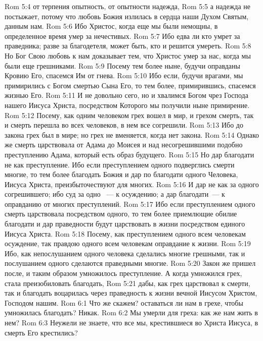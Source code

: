 \vs Rom 5:4 от терпения опытность, от опытности надежда,
\vs Rom 5:5 а надежда не постыжает, потому что любовь Божия излилась в сердца наши Духом Святым, данным нам.
\vs Rom 5:6 Ибо Христос, когда еще мы были немощны, в определенное время умер за нечестивых.
\vs Rom 5:7 Ибо едва ли кто умрет за праведника; разве за благодетеля, может быть, кто и решится умереть.
\vs Rom 5:8 Но Бог Свою любовь к нам доказывает тем, что Христос умер за нас, когда мы были еще грешниками.
\vs Rom 5:9 Посему тем более ныне, будучи оправданы Кровию Его, спасемся Им от гнева.
\vs Rom 5:10 Ибо если, будучи врагами, мы примирились с Богом смертью Сына Его, то тем более, примирившись, спасемся жизнью Его.
\vs Rom 5:11 И не довольно сего, но и хвалимся Богом чрез Господа нашего Иисуса Христа, посредством Которого мы получили ныне примирение.
\rsbpar\vs Rom 5:12 Посему, как одним человеком грех вошел в мир, и грехом смерть, так и смерть перешла во всех человеков,  в нем все согрешили.
\vs Rom 5:13 Ибо  до закона грех был в мире; но грех не вменяется, когда нет закона.
\vs Rom 5:14 Однако же смерть царствовала от Адама до Моисея и над несогрешившими подобно преступлению Адама, который есть образ будущего.
\vs Rom 5:15 Но дар благодати не как преступление. Ибо если преступлением одного подверглись смерти многие, то тем более благодать Божия и дар по благодати одного Человека, Иисуса Христа, преизбыточествуют для многих.
\vs Rom 5:16 И дар не как  за одного согрешившего; ибо суд за одно ~--- к осуждению; а дар благодати~--- к оправданию от многих преступлений.
\vs Rom 5:17 Ибо если преступлением одного смерть царствовала посредством одного, то тем более приемлющие обилие благодати и дар праведности будут царствовать в жизни посредством единого Иисуса Христа.
\vs Rom 5:18 Посему, как преступлением одного всем человекам осуждение, так правдою одного всем человекам оправдание к жизни.
\vs Rom 5:19 Ибо, как непослушанием одного человека сделались многие грешными, так и послушанием одного сделаются праведными многие.
\vs Rom 5:20 Закон же пришел после, и таким образом умножилось преступление. А когда умножился грех, стала преизобиловать благодать,
\vs Rom 5:21 дабы, как грех царствовал к смерти, так и благодать воцарилась через праведность к жизни вечной Иисусом Христом, Господом нашим.
\vs Rom 6:1 Что же скажем? оставаться ли нам в грехе, чтобы умножилась благодать? Никак.
\vs Rom 6:2 Мы умерли для греха: как же нам жить в нем?
\vs Rom 6:3 Неужели не знаете, что все мы, крестившиеся во Христа Иисуса, в смерть Его крестились?
